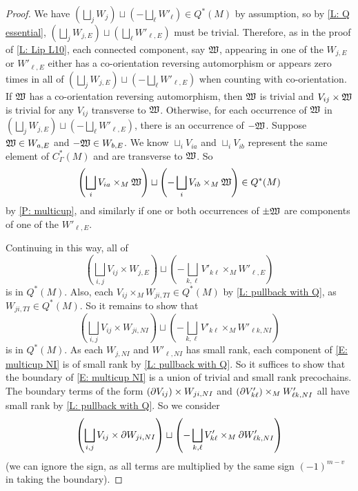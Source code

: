 \begin{proof}
We have $(\bigsqcup_j W_{j})\sqcup (-\bigsqcup_\ell W'_{\ell}) \in Q^*(M)$ by assumption, so
by \cref{L: Q essential}, $\left(\bigsqcup_j W_{j,E}\right)\sqcup \left(\bigsqcup_\ell W'_{\ell,E}\right)$ must be trivial. Therefore, as in the proof of \cref{L: Lip L10}, each connected component, say $\mathfrak W$, appearing in one of the $W_{j,E}$ or $W'_{\ell, E}$ either has a co-orientation reversing automorphism or appears zero times in all of $(\bigsqcup_j W_{j,E})\sqcup (-\bigsqcup_\ell W'_{\ell,E})$ when counting with co-orientation. If $\mathfrak W$ has a co-orientation reversing automorphism, then $\mathfrak W$ is trivial and $V_{ij} \times \mathfrak W$ is trivial for any $V_{ij}$ transverse to $\mathfrak W$. Otherwise, for each occurrence of $\mathfrak W$ in $(\bigsqcup_j W_{j,E})\sqcup (-\bigsqcup_\ell W'_{\ell,E})$, there is an occurrence of $-\mathfrak W$. Suppose $\mathfrak W \in W_{a,E}$ and $-\mathfrak W \in W_{b,E}$. We know $\sqcup_i V_{ia}$ and $\sqcup_i V_{ib}$ represent the same element of $C^*_\Gamma(M)$ and are transverse to $\mathfrak W$. So
$$\left(\bigsqcup_i V_{ia} \times_M \mathfrak W\right)\sqcup \left(-\bigsqcup_i V_{ib} \times_M \mathfrak W\right) \in Q^*(M)$$
 by
\cref{P: multicup}, and similarly if one or both occurrences of $\pm \mathfrak W$ are components of one of the $W'_{\ell, E}$.

Continuing in this way, all of $$\left(\bigsqcup_{i,j} V_{ij} \times W_{j,E}\right) \sqcup \left(-\bigsqcup_{k,\ell} V'_{k\ell} \times_M W'_{\ell,E}\right)$$
is in $Q^*(M)$. Also, each $V_{ij} \times_M W_{ji,TI} \in Q^*(M)$ by \cref{L: pullback with Q}, as $W_{ji,TI} \in Q^*(M)$.
So it remains to show that
\begin{equation}\label{E: multicup NI}
\left(\bigsqcup_{i,j} V_{ij} \times W_{ji,NI} \right) \sqcup \left(-\bigsqcup_{k,\ell} V'_{k\ell} \times_M W'_{\ell k,NI}\right)
\end{equation}
is in $Q^*(M)$. As each $W_{j,NI}$ and $W'_{\ell,NI}$ has small rank, each component of \eqref{E: multicup NI} is of small rank by \cref{L: pullback with Q}. So it suffices to show that the boundary of \eqref{E: multicup NI} is a union of trivial and small rank precochains.
The boundary terms of the form $(\partial V_{ij}) \times W_{ji,NI}$ and $(\partial V'_{k\ell}) \times_M W'_{\ell k,NI}$ all have small rank by \cref{L: pullback with Q}. So we consider
$$\left(\bigsqcup_{i,j} V_{ij} \times \partial W_{ji,NI} \right) \sqcup \left(-\bigsqcup_{k,\ell} V'_{k\ell} \times_M \partial W'_{\ell k,NI}\right)$$
(we can ignore the sign, as all terms are multiplied by the same sign $(-1)^{m-v}$ in taking the boundary).


\end{proof}
